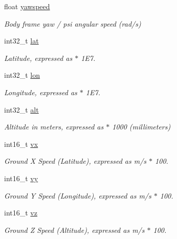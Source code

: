 \begin{DoxyCompactItemize}
float \hyperlink{struct____mavlink__hil__state__quaternion__t_ab3474522e90658e09da1a3bfaa235fab}{yawspeed}
\begin{DoxyCompactList}\small\item\em Body frame yaw / psi angular speed (rad/s) \end{DoxyCompactList}\item 
int32\+\_\+t \hyperlink{struct____mavlink__hil__state__quaternion__t_a2e54416e81eb004268570f4250242356}{lat}
\begin{DoxyCompactList}\small\item\em Latitude, expressed as $\ast$ 1\+E7. \end{DoxyCompactList}\item 
int32\+\_\+t \hyperlink{struct____mavlink__hil__state__quaternion__t_a345f022044f481073ea518e0ac65218a}{lon}
\begin{DoxyCompactList}\small\item\em Longitude, expressed as $\ast$ 1\+E7. \end{DoxyCompactList}\item 
int32\+\_\+t \hyperlink{struct____mavlink__hil__state__quaternion__t_abde8333e57ef71852b1de1529f3f3146}{alt}
\begin{DoxyCompactList}\small\item\em Altitude in meters, expressed as $\ast$ 1000 (millimeters) \end{DoxyCompactList}\item 
int16\+\_\+t \hyperlink{struct____mavlink__hil__state__quaternion__t_a0c33d3ef8decf225d84201d19b5da35f}{vx}
\begin{DoxyCompactList}\small\item\em Ground X Speed (Latitude), expressed as m/s $\ast$ 100. \end{DoxyCompactList}\item 
int16\+\_\+t \hyperlink{struct____mavlink__hil__state__quaternion__t_ae13c1fd1447d434847c4791181e270c1}{vy}
\begin{DoxyCompactList}\small\item\em Ground Y Speed (Longitude), expressed as m/s $\ast$ 100. \end{DoxyCompactList}\item 
int16\+\_\+t \hyperlink{struct____mavlink__hil__state__quaternion__t_a40093764fa265d7443ce5d6215bc6cfa}{vz}
\begin{DoxyCompactList}\small\item\em Ground Z Speed (Altitude), expressed as m/s $\ast$ 100. \end{DoxyCompactList}\item 

\end{DoxyCompactItemize}
